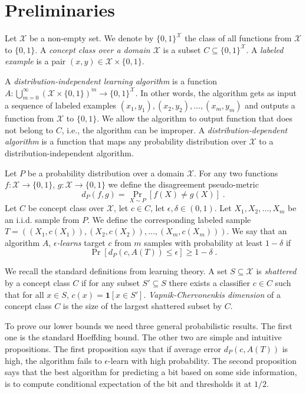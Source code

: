 \documentclass[10pt]{article}
\newcommand{\X}{\mathcal{X}}
\newcommand{\indicator}[1]{\mathbf{1}\left[{#1}\right]}
\begin{document}
\section{Preliminaries}

Let $\X$ be a non-empty set. We denote by $\{0,1\}^\X$ the class of all
functions from $\X$ to $\{0,1\}$. A \emph{concept class over a domain $\X$} is a
subset $C \subseteq \{0,1\}^\X$. A \emph{labeled example} is a pair $(x,y) \in
\X \times \{0,1\}$.

A \emph{distribution-independent learning algorithm} is a function
$A:\bigcup_{m=0}^\infty \left(\X \times \{0,1\} \right)^m \to \{0,1\}^\X$. In
other words, the algorithm gets as input a sequence of labeled examples $(x_1,
y_1), (x_2, y_2), \dots, (x_m, y_m)$ and outputs a function from $\X$ to
$\{0,1\}$. We allow the algorithm to output function that does not belong to
$C$, i.e., the algorithm can be improper. A \emph{distribution-dependent
algorithm} is a function that maps any probability distribution over $\X$ to a
distribution-independent algorithm.

Let $P$ be a probability distribution over a domain $\X$. For any two functions
$f:\X \to \{0,1\}$, $g:\X \to \{0,1\}$ we define the disagreement pseudo-metric
$$
d_P(f,g) = \Pr_{X \sim P}[f(X) \neq g(X)] \; .
$$
Let $C$ be concept class over $\X$, let $c \in C$, let $\epsilon, \delta \in (0,1)$.
Let  $X_1, X_2, \dots, X_m$ be an i.i.d. sample from $P$. We define the corresponding
labeled sample $T = ((X_1, c(X_1)), (X_2, c(X_2)), \dots, (X_m, c(X_m)))$.
We say that an algorithm $A$, \emph{$\epsilon$-learns} target $c$ from $m$ samples
with probability at least $1 - \delta$ if
$$
\Pr \left[d_P(c,A(T)) \le \epsilon \right]  \ge 1 - \delta \; .
$$

We recall the standard definitions from learning theory.  A set $S \subseteq \X$
is \emph{shattered} by a concept class $C$ if for any subset $S' \subseteq S$
there exists a classifier $c \in C$ such that for all $x \in S$, $c(x) =
\indicator{x \in S'}$. \emph{Vapnik-Chervonenkis dimension} of a concept class
$C$ is the size of the largest shattered subset by $C$.

To prove our lower bounds we need three general probabilistic results. The first
one is the standard Hoeffding bound. The other two are simple and intuitive
propositions. The first proposition says that if average error $d_P(c,A(T))$ is
high, the algorithm fails to $\epsilon$-learn with high probability. The second
proposition says that the best algorithm for predicting a bit based on some side
information, is to compute conditional expectation of the bit and thresholds it
at $1/2$.
\end{document}
